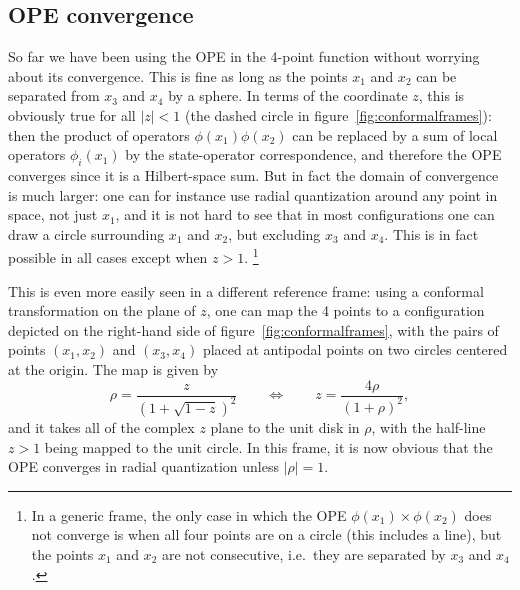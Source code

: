 \documentclass[a4paper,12pt]{article}
\numberwithin{equation}{section}
\begin{document}
\subsection{OPE convergence}

So far we have been using the OPE in the 4-point function without worrying about its convergence. This is fine as long as the points $x_1$ and $x_2$ can be separated from $x_3$ and $x_4$ by a sphere. 
In terms of the coordinate $z$, this is obviously true for all $\left| z \right| < 1$ (the dashed circle in figure~\ref{fig:conformalframes}): then the product of operators $\phi(x_1) \phi(x_2)$ can be replaced by a sum of local operators $\phi_i(x_1)$ by the state-operator correspondence, and therefore the OPE converges since it is a Hilbert-space sum. But in fact the domain of convergence is much larger: one can for instance use radial quantization around any point in space, not just $x_1$, and it is not hard to see that in most configurations one can draw a circle surrounding $x_1$ and $x_2$, but excluding $x_3$ and $x_4$. This is in fact possible in all cases except when $z > 1$.%
%
\footnote{In a generic frame, the only case in which the OPE $\phi(x_1) \times \phi(x_2)$ does not converge is when all four points are on a circle (this includes a line), but the points $x_1$ and $x_2$ are not consecutive, i.e.~they are separated by $x_3$ and $x_4$.}
%

This is even more easily seen in a different reference frame: using a conformal transformation on the plane of $z$, one can map the 4 points to a configuration depicted on the right-hand side of figure~\ref{fig:conformalframes}, with the pairs of points $(x_1, x_2) $ and  $(x_3, x_4)$ placed at antipodal points on two circles centered at the origin. The map is given by
\begin{equation}
	\rho = \frac{z}{\left( 1 + \sqrt{1-z} \right)^2}
	\qquad\Leftrightarrow\qquad
	z = \frac{4\rho}{(1 + \rho)^2},
\end{equation}
and it takes all of the complex $z$ plane to the unit disk in $\rho$, with the half-line $z > 1$ being mapped to the unit circle. In this frame, it is now obvious that the OPE converges in radial quantization unless $\left| \rho \right| = 1$.
\end{document}
